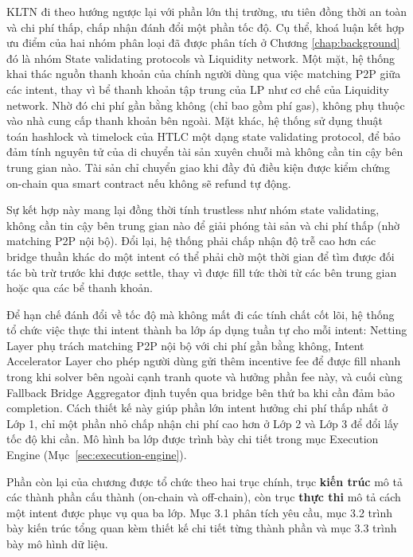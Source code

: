 KLTN đi theo hướng ngược lại với phần lớn thị trường, ưu tiên đồng thời
an toàn và chi phí thấp, chấp nhận đánh đổi một phần tốc độ.
Cụ thể, khoá luận kết hợp ưu điểm của hai nhóm phân loại đã được phân 
tích ở Chương \ref{chap:background} đó là nhóm State validating protocols
và Liquidity network.
Một mặt, hệ thống khai thác nguồn thanh khoản của chính người dùng qua việc
matching P2P giữa các intent,
thay vì bể thanh khoản tập trung của LP như cơ chế của Liquidity network.
Nhờ đó chi phí gần bằng không (chỉ bao gồm phí gas), 
không phụ thuộc vào nhà cung cấp thanh khoản bên ngoài. 
Mặt khác, hệ thống sử dụng thuật toán hashlock và timelock của HTLC  
một dạng state validating protocol, 
để bảo đảm tính nguyên tử của di chuyển tài sản xuyên chuỗi mà không 
cần tin cậy bên trung gian nào. 
Tài sản chỉ chuyển giao khi đầy đủ điều kiện được kiểm chứng on-chain
qua smart contract nếu không sẽ refund tự động.

Sự kết hợp này mang lại đồng thời tính trustless như nhóm state validating,
không cần tin cậy bên trung gian nào để giải phóng tài sản
và chi phí thấp (nhờ matching P2P nội bộ).
Đổi lại, hệ thống phải chấp nhận độ trễ cao hơn các bridge
thuần khác do một intent có thể phải chờ một thời gian
để tìm được đối tác bù trừ trước khi được settle,
thay vì được fill tức thời từ các bên trung gian hoặc qua các bể thanh khoản.

Để hạn chế đánh đổi về tốc độ mà không mất đi các tính chất cốt lõi,
hệ thống tổ chức việc thực thi intent thành ba lớp áp dụng tuần tự cho
mỗi intent: Netting Layer phụ trách matching P2P nội bộ với chi phí
gần bằng không, Intent Accelerator Layer cho phép người dùng gửi thêm
incentive fee để được fill nhanh trong khi solver bên ngoài
cạnh tranh quote và hưởng phần fee này, và cuối cùng
Fallback Bridge Aggregator định tuyến qua bridge bên thứ ba khi cần 
đảm bảo completion. Cách thiết kế này giúp phần lớn intent hưởng 
chi phí thấp nhất ở Lớp 1, chỉ một phần nhỏ chấp nhận chi phí cao hơn 
ở Lớp 2 và Lớp 3 để đổi lấy tốc độ khi cần. Mô hình ba lớp được 
trình bày chi tiết trong mục Execution Engine 
(Mục~\ref{sec:execution-engine}).

Phần còn lại của chương được tổ chức theo hai trục chính, 
trục \textbf{kiến trúc} mô tả các thành phần cấu thành (on-chain và 
off-chain), còn trục \textbf{thực thi} mô tả 
cách một intent được phục vụ qua ba lớp. 
Mục 3.1 phân tích yêu cầu, mục 3.2 trình bày kiến trúc tổng quan kèm 
thiết kế chi tiết từng thành phần và mục 3.3 trình bày mô hình dữ liệu.

